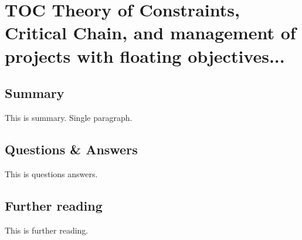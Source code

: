 \section{TOC Theory of Constraints, Critical Chain, and management of projects with floating objectives...}

\subsection{Summary}
This is summary. Single paragraph.

\subsection{Questions \& Answers}
This is questions answers.

\subsection{Further reading}
This is further reading.
